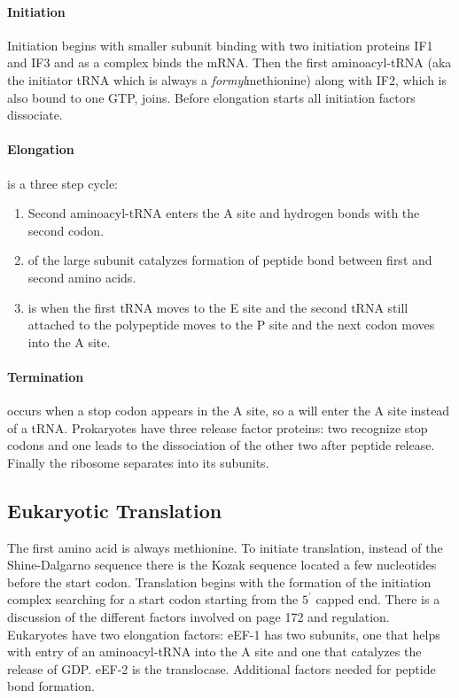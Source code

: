 \documentclass[../Bio_chemistryReview.tex]{subfiles}
\begin{document}
\paragraph{Initiation}
Initiation begins with smaller subunit binding with two initiation proteins IF1
and IF3 and as a complex binds the mRNA. Then the first aminoacyl-tRNA
(aka the initiator tRNA which is always a \textit{formyl}methionine) along with
IF2, which is also bound to one GTP, joins. Before elongation starts all
initiation factors dissociate.
\paragraph{Elongation}
is a three step cycle:
\begin{enumerate}
  \item Second aminoacyl-tRNA enters the A site and hydrogen bonds with the
    second codon.
  \item {} of the large subunit catalyzes formation of
    peptide bond between first and second amino acids.
  \item {} is when the first tRNA moves to the E site and
    the second tRNA still attached to the polypeptide moves to the P site and
    the next codon moves into the A site. 
\end{enumerate}
\paragraph{Termination}
occurs when a stop codon appears in the A site, so a  will enter the A site instead of a tRNA. Prokaryotes have three release
factor proteins: two recognize stop codons and one leads to the dissociation of
the other two after peptide release. Finally the ribosome separates into its
subunits.

\subsection{Eukaryotic Translation}
The first amino acid is always methionine. To initiate translation, instead of
the Shine-Dalgarno sequence there is the Kozak sequence located a few
nucleotides before the start codon. Translation begins with the formation of the
initiation complex searching for a start codon starting from the $ 5^{\prime} $
capped end. There is a discussion of the different factors involved on page 172
and regulation. Eukaryotes have two elongation factors: eEF-1 has two subunits,
one that helps with entry of an aminoacyl-tRNA into the A site and one that
catalyzes the release of GDP. eEF-2 is the translocase. Additional factors
needed for peptide bond formation.
\end{document}

